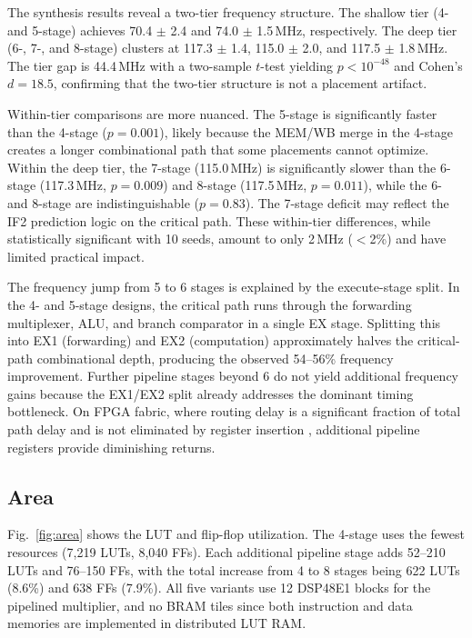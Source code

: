 \documentclass[journal]{IEEEtran}
\begin{document}
\begin{table}[t]
\begin{table}[t]
\begin{table}[t]
The synthesis results reveal a two-tier frequency structure. The shallow tier (4- and 5-stage) achieves 70.4 $\pm$ 2.4 and 74.0 $\pm$ 1.5\,MHz, respectively. The deep tier (6-, 7-, and 8-stage) clusters at 117.3 $\pm$ 1.4, 115.0 $\pm$ 2.0, and 117.5 $\pm$ 1.8\,MHz. The tier gap is 44.4\,MHz with a two-sample $t$-test yielding $p < 10^{-48}$ and Cohen's $d = 18.5$, confirming that the two-tier structure is not a placement artifact.

Within-tier comparisons are more nuanced. The 5-stage is significantly faster than the 4-stage ($p = 0.001$), likely because the MEM/WB merge in the 4-stage creates a longer combinational path that some placements cannot optimize. Within the deep tier, the 7-stage (115.0\,MHz) is significantly slower than the 6-stage (117.3\,MHz, $p = 0.009$) and 8-stage (117.5\,MHz, $p = 0.011$), while the 6- and 8-stage are indistinguishable ($p = 0.83$). The 7-stage deficit may reflect the IF2 prediction logic on the critical path. These within-tier differences, while statistically significant with 10 seeds, amount to only 2\,MHz ($<$2\%) and have limited practical impact.

The frequency jump from 5 to 6 stages is explained by the execute-stage split. In the 4- and 5-stage designs, the critical path runs through the forwarding multiplexer, ALU, and branch comparator in a single EX stage. Splitting this into EX1 (forwarding) and EX2 (computation) approximately halves the critical-path combinational depth, producing the observed 54--56\% frequency improvement. Further pipeline stages beyond 6 do not yield additional frequency gains because the EX1/EX2 split already addresses the dominant timing bottleneck. On FPGA fabric, where routing delay is a significant fraction of total path delay and is not eliminated by register insertion \cite{boutros2020fpga}, additional pipeline registers provide diminishing returns.

\subsection{Area}

Fig.~\ref{fig:area} shows the LUT and flip-flop utilization. The 4-stage uses the fewest resources (7{,}219 LUTs, 8{,}040 FFs). Each additional pipeline stage adds 52--210 LUTs and 76--150 FFs, with the total increase from 4 to 8 stages being 622 LUTs (8.6\%) and 638 FFs (7.9\%). All five variants use 12 DSP48E1 blocks for the pipelined multiplier, and no BRAM tiles since both instruction and data memories are implemented in distributed LUT RAM.


\end{table}
\end{table}
\end{table}
\end{document}
